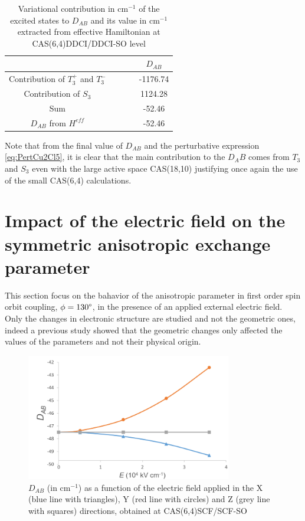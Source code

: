 \documentclass[10pt]{report}
\numberwithin{equation}{section}
\begin{document}
\begin{table}
    \centering
    \begin{tabular}{c c c}
        \hline
        \hline
         & $\qquad$&$D_{AB}$\\
         \hline
         Contribution of $T_3^+$ and $T_3^-$& $\qquad$& -1176.74 \\
         Contribution of $S_3$& $\qquad$& 1124.28\\
         Sum &$\qquad$ &-52.46\\
         $D_{AB}$ from $H^{eff}$ & $\qquad$ &-52.46\\
         \hline
         \hline
    \end{tabular}
    \caption{Variational contribution in cm$^{-1}$ of the excited states to $D_{AB}$ and its value in cm$^{-1}$ extracted from effective Hamiltonian at CAS(6,4)DDCI/DDCI-SO level}
    \label{ContE0}
\end{table}

Note that from the final value of $D_{AB}$ and the perturbative expression \ref{eq:PertCu2Cl5}, it is clear that the main contribution to the $D_AB$ comes from $T_3$ and $S_3$ even with the large active space CAS(18,10) justifying once again the use of the small CAS(6,4) calculations.


\section{Impact of the electric field on the symmetric anisotropic exchange parameter}

This section focus on the bahavior of the anisotropic parameter in first order spin orbit coupling, $\phi=130\degree$, in the presence of an applied external electric field.
Only the changes in electronic structure are studied and not the geometric ones, indeed a previous study showed that the geometric changes only affected the values of the parameters and not their physical origin. 

\begin{figure}[h!]
    \centering
    \includegraphics[width=0.8\textwidth]{Images/D_AB_E.png}
    \caption{$D_{AB}$ (in cm$^{-1}$) as a function of the electric field applied in the X (blue line with triangles), Y (red line with circles) and Z (grey line with squares) directions, obtained at CAS(6,4)SCF/SCF-SO}
    \label{DABchamp}
\end{figure}
\end{document}
